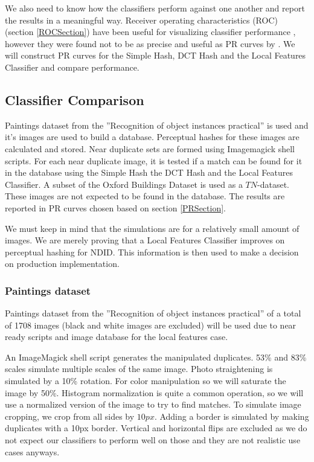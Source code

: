 \documentclass[english,12pt,a4paper,pdftex,elec,utf8]{aaltothesis}
\begin{document}
We also need to know how the classifiers perform against one another and report the results in a meaningful way. Receiver operating characteristics (ROC) (section \ref{ROCSection}) have been useful for visualizing classifier performance \cite{Fawcett2006}, however they were found not to be as precise and useful as PR curves by \cite{Davis2006}. We will construct PR curves for the Simple Hash, DCT Hash and the Local Features Classifier and compare performance.

\subsection{Classifier Comparison}
Paintings dataset from the ''Recognition of object instances practical'' \cite{Vedaldi2012} is used and it's images are used to build a database. Perceptual hashes for these images are calculated and stored. Near duplicate sets are formed using Imagemagick shell scripts. For each near duplicate image, it is tested if a match can be found for it in the database using the Simple Hash the DCT Hash and the Local Features Classifier. A subset of the Oxford Buildings Dataset \cite{PhilbinJamesArandjelovicReljaZisserman2012} is used as a $TN$-dataset. These images are not expected to be found in the database. The results are reported in PR curves chosen based on section \ref{PRSection}.

We must keep in mind that the simulations are for a relatively small amount of images. We are merely proving that a Local Features Classifier improves on perceptual hashing for NDID. This information is then used to make a decision on production implementation.

\subsubsection{Paintings dataset}
Paintings dataset from the ''Recognition of object instances practical'' \cite{Vedaldi2012} of a total of 1708 images (black and white images are excluded) will be used due to near ready scripts and image database for the local features case.

An ImageMagick shell script generates the manipulated duplicates. 53\% and 83\% scales simulate multiple scales of the same image. Photo straightening is simulated by a 10\% rotation. For color manipulation so we will saturate the image by 50\%. Histogram normalization is quite a common operation, so we will use a normalized version of the image to try to find matches. To simulate image cropping, we crop from all sides by $10px$. Adding a border is simulated by making duplicates with a 10px border. Vertical and horizontal flips are excluded as we do not expect our classifiers to perform well on those and they are not realistic use cases anyways.
\end{document}
